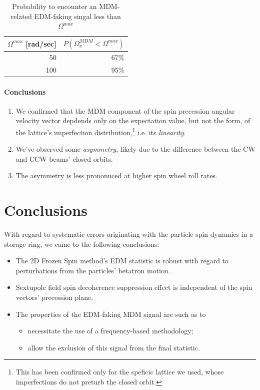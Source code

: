 \documentclass[preprint, review]{elsarticle}
\newcommand{\W}{\Omega}
\begin{document}
\begin{table}[h]\centering
  \caption{Probability to encounter an MDM-related EDM-faking singal less than $\W^{max}$\label{tbl:MDM_CI}}
  \begin{tabular}{rr}
    \hline
    $\W^{max}$ [rad/sec] & $P(\W_x^{MDM} < \W^{max})$ \\
    \hline
    50 & 67\% \\
    100 & 95\% \\
    \hline
  \end{tabular}
\end{table}

\paragraph{Conclusions}
\begin{enumerate}[(1)]
\item We confirmed that the MDM component of the spin precession angular velocity vector depdends only on the
  expectation value, but not the form, of the lattice's imperfection distribution,\footnote{This has been
    confirmed only for the speficic lattice we used, whose imperfections do not preturb the closed orbit.}
  i.e. its \emph{linearity}.
\item We've observed some \emph{asymmetry}, likely due to the difference between the
  CW and CCW beams' closed orbits.
\item The asymmetry is less prononuced at higher spin wheel roll rates.
\end{enumerate}

\section{Conclusions}
With regard to systematic errors originating with the particle spin dynamics in a storage ring,
we came to the following conclusions:
\begin{itemize}
\item The 2D Frozen Spin method's EDM statistic is robust with regard to perturbations from the particles'
  betatron motion.
\item Sextupole field spin decoherence suppression effect is independent of the spin vectors'
  precession plane.
\item The properties of the EDM-faking MDM signal are such as to
  \begin{itemize}
  \item necessitate the use of a frequency-based methodology;
  \item allow the exclusion of this signal from the final statistic.
  \end{itemize}
\end{itemize}
\end{document}
